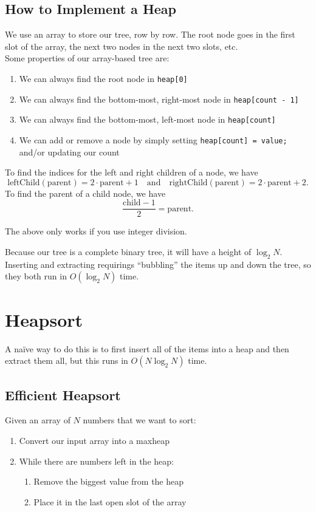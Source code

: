 \documentclass[class=article, crop=false]{standalone}
\begin{document}
  \subsection{How to Implement a Heap}
  We use an array to store our tree, row by row. The root node goes in the first slot of the array, the next two nodes in the next two slots, etc. \\[10pt]
  Some properties of our array-based tree are:
  \begin{enumerate}
    \item We can always find the root node in \texttt{heap[0]}
    \item We can always find the bottom-most, right-most node in \texttt{heap[count - 1]}
    \item We can always find the bottom-most, left-most node in \texttt{heap[count]}
    \item We can add or remove a node by simply setting \texttt{heap[count] = value;} and/or updating our count
  \end{enumerate}
  To find the indices for the left and right children of a node, we have
  \[
    \mathrm{leftChild}(\text{parent}) = 2\cdot \text{parent} + 1 \quad \text{and}\quad \mathrm{rightChild}(\text{parent}) = 2\cdot \text{parent} + 2.
  \]
  To find the parent of a child node, we have
  \[
    \frac{\text{child} - 1}{2} = \text{parent}.
  \]
  \begin{note}{}
    The above only works if you use integer division.
  \end{note}
  Because our tree is a complete binary tree, it will have a height of $\log_2N$. Inserting and extracting requirings ``bubbling'' the items up and down the tree, so they both run in $O(\log_2N)$ time.
  \section{Heapsort}
  A na\"ive way to do this is to first insert all of the items into a heap and then extract them all, but this runs in $O(N\log_2N)$ time.
  \subsection{Efficient Heapsort}
  Given an array of $N$ numbers that we want to sort:
  \begin{enumerate}
    \item Convert our input array into a maxheap
    \item While there are numbers left in the heap:
    \begin{enumerate}[label=(\alph*)]
      \item Remove the biggest value from the heap
      \item Place it in the last open slot of the array
    \end{enumerate}
  \end{enumerate}
\end{document}
